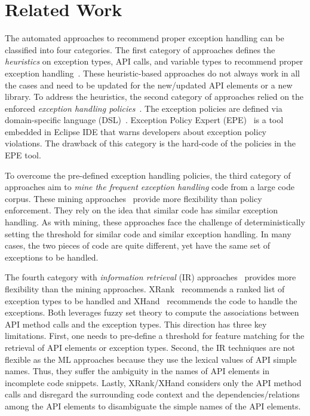 \section{Related Work}
\label{sec:related}

The automated approaches to recommend proper exception handling can be
classified into four categories. The first category of approaches
defines the {\em heuristics} on exception types, API calls, and
variable types to recommend proper exception
handling~\cite{barbosa-bsse12}. These heuristic-based approaches do
not always work in all the cases and need to be updated for the
new/updated API elements or a new library. To address the heuristics,
the second category of approaches relied on the enforced {\em
  exception handling policies}~\cite{barbosa-tse16,barbosa-saner18}.
The exception policies are defined via domain-specific language
(DSL)~\cite{barbosa-tse16}. Exception Policy Expert
(EPE)~\cite{barbosa-saner18} is a tool embedded in Eclipse IDE that
warns developers about exception policy violations. The drawback of
this category is the hard-code of the policies in the EPE tool.

To overcome the pre-defined exception handling policies, the third
category of approaches aim to {\em mine the frequent exception
  handling} code from a large code corpus. These mining
approaches~\cite{chanchal-scam14} provide more flexibility than policy
enforcement. They rely on the idea that similar code has similar
exception handling. As with mining, these approaches face the
challenge of deterministically setting the threshold for similar code
and similar exception handling. In many cases, the two pieces of code
are quite different, yet have the same set of exceptions to be
handled.

The fourth category with {\em information retrieval} (IR)
approaches~\cite{xrank-fse20} provides more flexibility than the
mining approaches. XRank~\cite{xrank-fse20} recommends a ranked list
of exception types to be handled and XHand~\cite{xrank-fse20}
recommends the code to handle the exceptions. Both leverages fuzzy set
theory to compute the associations between API method calls and the
exception types. This direction has three key limitations. First, one
needs to pre-define a threshold for feature matching for the retrieval
of API elements or exception types. Second, the IR techniques are not
flexible as the ML approaches because they use the lexical values of
API simple names. Thus, they suffer the ambiguity in the names of API
elements in incomplete code snippets. Lastly, XRank/XHand considers
only the API method calls and disregard the surrounding code context
and the dependencies/relations among the API elements to disambiguate
the simple names of the API elements.

